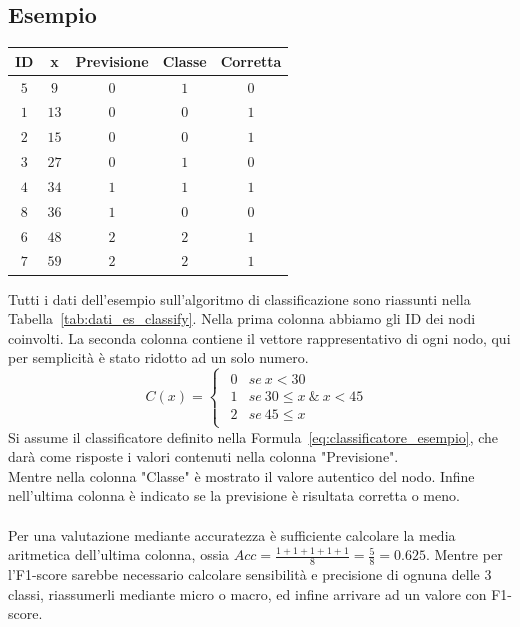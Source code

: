 \subsection{Esempio}
\begin{center}
	\begin{tabular}{|c|c|c|c|c|}
		\hline
		ID & x & Previsione & Classe & Corretta\\
		\hline
		$5$ & $9$ & $0$ & $1$ & $0$\\
		$1$ & $13$ & $0$ & $0$ & $1$\\
		$2$ & $15$ & $0$ & $0$ & $1$\\
		$3$ & $27$ & $0$ & $1$ & $0$\\
		$4$ & $34$ & $1$ & $1$ & $1$\\
		$8$ & $36$ & $1$ & $0$ & $0$\\
		$6$ & $48$ & $2$ & $2$ & $1$\\
		$7$ & $59$ & $2$ & $2$ & $1$\\
		\hline
	\end{tabular}
	\label{tab:dati_es_classify}
\end{center}
Tutti i dati dell'esempio sull'algoritmo di classificazione sono riassunti nella Tabella~\ref{tab:dati_es_classify}. Nella prima colonna abbiamo gli ID dei nodi coinvolti. La seconda colonna contiene il vettore rappresentativo di ogni nodo, qui per semplicità è stato ridotto ad un solo numero.
%
\begin{equation}
	C(x)=
		\begin{cases}
			\begin{array}{ll}
				0 & se \ x < 30\\
				1 & se \ 30 \leq x \ \&\  x < 45\\
				2 & se \ 45 \leq x
			\end{array}
		\end{cases}
	\label{eq:classificatore_esempio}
\end{equation}
%
Si assume il classificatore definito nella Formula~\ref{eq:classificatore_esempio}, che darà come risposte i valori contenuti nella colonna "Previsione".\\
Mentre nella colonna "Classe" è mostrato il valore autentico del nodo. Infine nell'ultima colonna è indicato se la previsione è risultata corretta o meno.\\
\\
Per una valutazione mediante accuratezza è sufficiente calcolare la media aritmetica dell'ultima colonna, ossia $ Acc = \frac{1+1+1+1+1}{8} = \frac{5}{8} = 0.625$. Mentre per l'F1-score sarebbe necessario calcolare sensibilità e precisione di ognuna delle 3 classi, riassumerli mediante micro o macro, ed infine arrivare ad un valore con F1-score.
%
